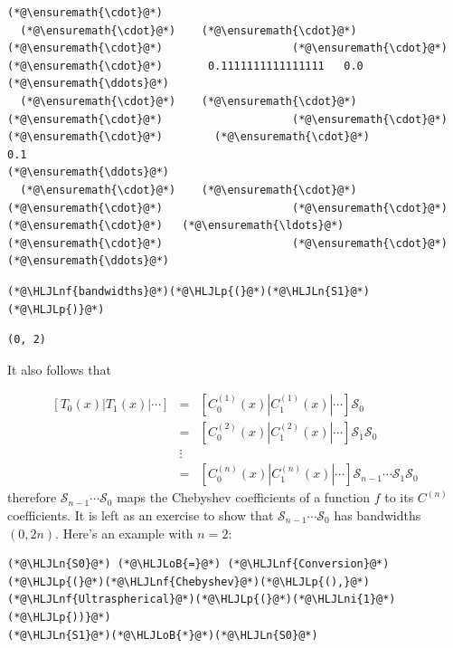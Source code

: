 \documentclass[12pt,a4paper]{article}
\newcommand{\HLJLn}[1]{#1}
\newcommand{\HLJLnf}[1]{\textcolor[RGB]{66,102,213}{#1}}
\newcommand{\HLJLni}[1]{\textcolor[RGB]{59,151,46}{#1}}
\newcommand{\HLJLoB}[1]{\textcolor[RGB]{102,102,102}{\textbf{#1}}}
\newcommand{\HLJLp}[1]{#1}
\begin{document}
\begin{lstlisting}
(*@\ensuremath{\cdot}@*)
  (*@\ensuremath{\cdot}@*)    (*@\ensuremath{\cdot}@*)     (*@\ensuremath{\cdot}@*)                    (*@\ensuremath{\cdot}@*)      (*@\ensuremath{\cdot}@*)       0.1111111111111111   0.0  
(*@\ensuremath{\ddots}@*)
  (*@\ensuremath{\cdot}@*)    (*@\ensuremath{\cdot}@*)     (*@\ensuremath{\cdot}@*)                    (*@\ensuremath{\cdot}@*)      (*@\ensuremath{\cdot}@*)        (*@\ensuremath{\cdot}@*)                   0.1  
(*@\ensuremath{\ddots}@*)
  (*@\ensuremath{\cdot}@*)    (*@\ensuremath{\cdot}@*)     (*@\ensuremath{\cdot}@*)                    (*@\ensuremath{\cdot}@*)      (*@\ensuremath{\cdot}@*)   (*@\ensuremath{\ldots}@*)    (*@\ensuremath{\cdot}@*)                    (*@\ensuremath{\cdot}@*)   
(*@\ensuremath{\ddots}@*)
\end{lstlisting}


\begin{lstlisting}
(*@\HLJLnf{bandwidths}@*)(*@\HLJLp{(}@*)(*@\HLJLn{S1}@*)(*@\HLJLp{)}@*)
\end{lstlisting}

\begin{lstlisting}
(0, 2)
\end{lstlisting}


It also follows that 


\begin{eqnarray*}
\left[ T_0(x) | T_1(x) | \cdots  \right] &=&  \left[ C^{(1)}_0(x) | C^{(1)}_1(x) | \cdots  \right]\mathcal{S}_0 \\
&=& \left[ C^{(2)}_0(x) | C^{(2)}_1(x) | \cdots  \right]\mathcal{S}_1\mathcal{S}_0 \\
&\vdots &  \\
& = & \left[ C^{(n)}_0(x) | C^{(n)}_1(x) | \cdots  \right]\mathcal{S}_{n-1}\cdots\mathcal{S}_1\mathcal{S}_0
\end{eqnarray*}
therefore $\mathcal{S}_{n-1}\cdots\mathcal{S}_0$ maps the Chebyshev coefficients of a function $f$ to its $C^{(n)}$ coefficients.  It is left as an exercise to show that $\mathcal{S}_{n-1}\cdots\mathcal{S}_0$ has bandwidths $(0,2n)$.  Here's an example with $n = 2$:


\begin{lstlisting}
(*@\HLJLn{S0}@*) (*@\HLJLoB{=}@*) (*@\HLJLnf{Conversion}@*)(*@\HLJLp{(}@*)(*@\HLJLnf{Chebyshev}@*)(*@\HLJLp{(),}@*)(*@\HLJLnf{Ultraspherical}@*)(*@\HLJLp{(}@*)(*@\HLJLni{1}@*)(*@\HLJLp{))}@*)
(*@\HLJLn{S1}@*)(*@\HLJLoB{*}@*)(*@\HLJLn{S0}@*)
\end{lstlisting}
\end{document}
